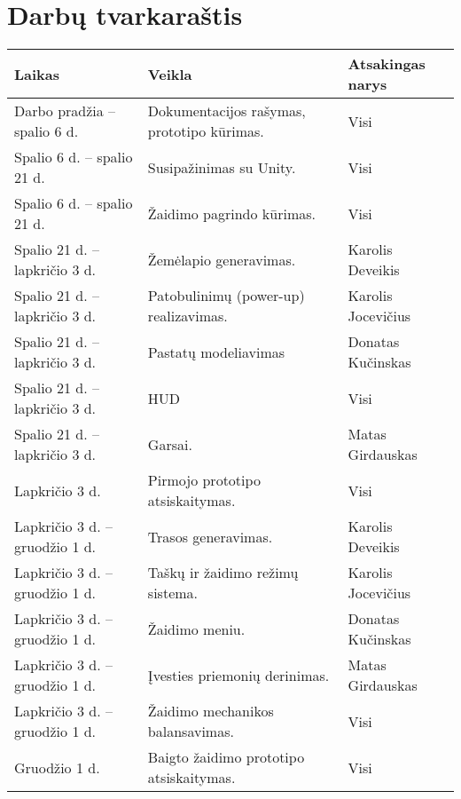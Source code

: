 \section{Darbų tvarkaraštis}

\newcommand{\schedule}[1]{
    \taburowcolors{white .. gray!20}
    \begin{longtabu}{ X[c, m] X[c, m] X[c, m] }
        \textbf{Laikas} & \textbf{Veikla} & \textbf{Atsakingas narys} \\
        \endhead
        \tabucline{-}
        #1
    \end{longtabu}
}

\newcommand{\scheduleEntry}[3]{
    #1 & #2 & #3 \\
}

\schedule{
    \scheduleEntry
    {Darbo pradžia -- spalio 6 d.}
    {Dokumentacijos rašymas, prototipo kūrimas.}
    {Visi}
    \scheduleEntry
    {Spalio 6 d. -- spalio 21 d.}
    {Susipažinimas su Unity.}
    {Visi}
    \scheduleEntry
    {Spalio 6 d. -- spalio 21 d.}
    {Žaidimo pagrindo kūrimas.}
    {Visi}
    \scheduleEntry
    {Spalio 21 d. -- lapkričio 3 d.}
    {Žemėlapio generavimas.}
    {Karolis Deveikis}
    \scheduleEntry
    {Spalio 21 d. -- lapkričio 3 d.}
    {Patobulinimų (power-up) realizavimas.}
    {Karolis Jocevičius}
    \scheduleEntry
    {Spalio 21 d. -- lapkričio 3 d.}
    {Pastatų modeliavimas}
    {Donatas Kučinskas}
    \scheduleEntry
    {Spalio 21 d. -- lapkričio 3 d.}
    {HUD}
    {Visi}
    \scheduleEntry
    {Spalio 21 d. -- lapkričio 3 d.}
    {Garsai.}
    {Matas Girdauskas}
    \scheduleEntry
    {Lapkričio 3 d.}
    {Pirmojo prototipo atsiskaitymas.}
    {Visi}
    \scheduleEntry
    {Lapkričio 3 d. -- gruodžio 1 d.}
    {Trasos generavimas.}
    {Karolis Deveikis}
    \scheduleEntry
    {Lapkričio 3 d. -- gruodžio 1 d.}
    {Taškų ir žaidimo režimų sistema.}
    {Karolis Jocevičius}
    \scheduleEntry
    {Lapkričio 3 d. -- gruodžio 1 d.}
    {Žaidimo meniu.}
    {Donatas Kučinskas}
    \scheduleEntry
    {Lapkričio 3 d. -- gruodžio 1 d.}
    {Įvesties priemonių derinimas.}
    {Matas Girdauskas}
    \scheduleEntry
    {Lapkričio 3 d. -- gruodžio 1 d.}
    {Žaidimo mechanikos balansavimas.}
    {Visi}
    \scheduleEntry
    {Gruodžio 1 d.}
    {Baigto žaidimo prototipo atsiskaitymas.}
    {Visi}
}
